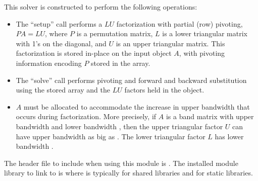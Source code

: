 This solver is constructed to perform the following operations:
\begin{itemize}
\item The ``setup'' call performs a $LU$ factorization with
  partial (row) pivoting, $PA=LU$, where $P$ is a permutation matrix,
  $L$ is a lower triangular matrix with 1's on the diagonal, and $U$
  is an upper triangular matrix.  This factorization is stored
  in-place on the input {\sunmatband} object $A$, with pivoting
  information encoding $P$ stored in the  array.
\item The ``solve'' call performs pivoting and forward and
  backward substitution using the stored  array and the
  $LU$ factors held in the {\sunmatband} object.
\item
  {\warn} $A$ must be allocated to accommodate the increase in upper
  bandwidth that occurs during factorization.  More precisely, if $A$
  is a band matrix with upper bandwidth  and lower bandwidth
  , then the upper triangular factor $U$ can have upper
  bandwidth as big as . The lower triangular
  factor $L$ has lower bandwidth .
\end{itemize}


\noindent The header file to include when using this module 
is . The installed module
library to link to is
where  is typically  for shared libraries and
 for static libraries. \\


